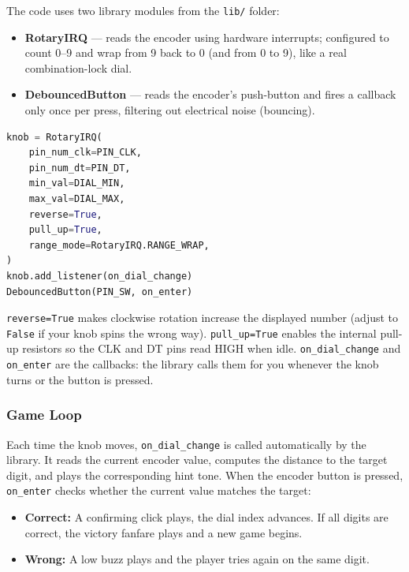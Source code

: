 The code uses two library modules from the \texttt{lib/} folder:

\begin{itemize}
    \item \textbf{RotaryIRQ} — reads the encoder using hardware interrupts; configured to count
          0--9 and wrap from 9 back to 0 (and from 0 to 9), like a real combination-lock dial.
    \item \textbf{DebouncedButton} — reads the encoder's push-button and fires a callback
          only once per press, filtering out electrical noise (bouncing).
\end{itemize}

\begin{lstlisting}[language=Python, caption=Setting up the encoder and button]
knob = RotaryIRQ(
    pin_num_clk=PIN_CLK,
    pin_num_dt=PIN_DT,
    min_val=DIAL_MIN,
    max_val=DIAL_MAX,
    reverse=True,
    pull_up=True,
    range_mode=RotaryIRQ.RANGE_WRAP,
)
knob.add_listener(on_dial_change)
DebouncedButton(PIN_SW, on_enter)
\end{lstlisting}

\texttt{reverse=True} makes clockwise rotation increase the displayed number (adjust to
\texttt{False} if your knob spins the wrong way). \texttt{pull\_up=True} enables the
internal pull-up resistors so the CLK and DT pins read HIGH when idle. \texttt{on\_dial\_change}
and \texttt{on\_enter} are the callbacks: the library calls them for you whenever the knob turns or
the button is pressed.

\subsubsection{Game Loop}

Each time the knob moves, \texttt{on\_dial\_change} is called automatically by the library.
It reads the current encoder value, computes the distance to the target digit, and plays
the corresponding hint tone. When the encoder button is pressed, \texttt{on\_enter} checks
whether the current value matches the target:

\begin{itemize}
    \item \textbf{Correct:} A confirming click plays, the dial index advances. If all digits
          are correct, the victory fanfare plays and a new game begins.
    \item \textbf{Wrong:} A low buzz plays and the player tries again on the same digit.
\end{itemize}

